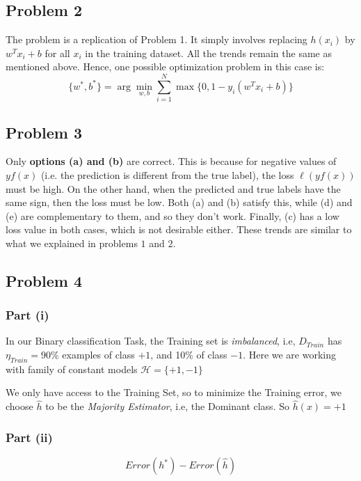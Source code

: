 \documentclass[12pt]{article}
\begin{document}
\subsection{Problem 2}

The problem is a replication of Problem 1. It simply involves replacing $h(x_i)$ by $w^Tx_i+b$ for all $x_i$ in the training dataset. All the trends remain the same as mentioned above. Hence, one possible optimization problem in this case is: $$\{w^*, b^*\} = \arg \min_{w,b} \sum_{i=1}^N \max\{0, 1-y_i(w^Tx_i+b)\}$$

\subsection{Problem 3}

Only\textbf{ options (a) and (b)} are correct. This is because for negative values of $yf(x)$ (i.e. the prediction is different from the true label), the loss $\ell(yf(x))$ must be high. On the other hand, when the predicted and true labels have the same sign, then the loss must be low. Both (a) and (b) satisfy this, while (d) and (e) are complementary to them, and so they don't work. Finally, (c) has a low loss value in both cases, which is not desirable either. These trends are similar to what we explained in problems $1$ and $2$.

\subsection{Problem 4}

\subsubsection{Part (i)}


In our Binary classification Task, the Training set is \textit{imbalanced}, i.e, $D_{Train}$ has $\eta_{Train} = 90\%$ examples of class $+1$, and 10\% of class $-1$. Here we are working with family of constant models $\mathcal{H} = \{+1, -1\}$

We only have access to the Training Set, so to minimize the Training error, we choose $\hat{h}$ to be the \textit{Majority Estimator}, i.e, the Dominant class. So $\hat{h}(x) = +1$

\subsubsection{Part (ii)}

\[Error(h^*) - Error(\hat{h})\]
\end{document}
